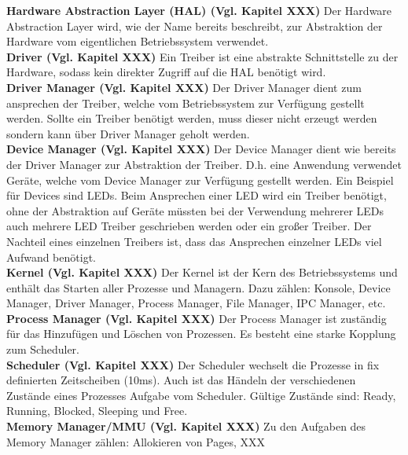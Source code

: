 \textbf{Hardware Abstraction Layer (HAL) (Vgl. Kapitel XXX)}
Der Hardware Abstraction Layer wird, wie der Name bereits beschreibt, zur Abstraktion der Hardware vom eigentlichen Betriebssystem verwendet. \\

\textbf{Driver (Vgl. Kapitel XXX)}
Ein Treiber ist eine abstrakte Schnittstelle zu der Hardware, sodass kein direkter Zugriff auf die HAL benötigt wird. \\

\textbf{Driver Manager (Vgl. Kapitel XXX)}
Der Driver Manager dient zum ansprechen der Treiber, welche vom Betriebssystem zur Verfügung gestellt werden. Sollte ein Treiber benötigt werden, muss dieser nicht erzeugt werden sondern kann über Driver Manager geholt werden. \\

\textbf{Device Manager (Vgl. Kapitel XXX)}
Der Device Manager dient wie bereits der Driver Manager zur Abstraktion der Treiber. D.h. eine Anwendung verwendet Geräte, welche vom Device Manager zur Verfügung gestellt werden. Ein Beispiel für Devices sind LEDs. Beim Ansprechen einer LED wird ein Treiber benötigt, ohne der Abstraktion auf Geräte müssten bei der Verwendung mehrerer LEDs auch mehrere LED Treiber geschrieben werden oder ein großer Treiber. Der Nachteil eines einzelnen Treibers ist, dass das Ansprechen einzelner LEDs viel Aufwand benötigt. \\

\textbf{Kernel (Vgl. Kapitel XXX)}
Der Kernel ist der Kern des Betriebssystems und enthält das Starten aller Prozesse und Managern. Dazu zählen: Konsole, Device Manager, Driver Manager, Process Manager, File Manager, IPC Manager, etc. \\

\textbf{Process Manager (Vgl. Kapitel XXX)}
Der Process Manager ist zuständig für das Hinzufügen und Löschen von Prozessen. Es besteht eine starke Kopplung zum Scheduler. \\

\textbf{Scheduler (Vgl. Kapitel XXX)}
Der Scheduler wechselt die Prozesse in fix definierten Zeitscheiben (10ms). Auch ist das Händeln der verschiedenen Zustände eines Prozesses Aufgabe vom Scheduler. Gültige Zustände sind: Ready, Running, Blocked, Sleeping und Free. \\

\textbf{Memory Manager/MMU (Vgl. Kapitel XXX)}
Zu den Aufgaben des Memory Manager zählen: Allokieren von Pages, XXX \\

